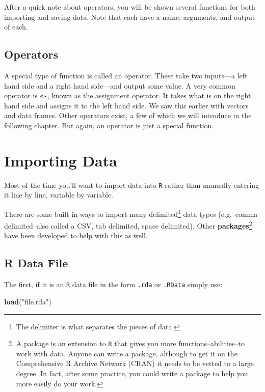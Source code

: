 \documentclass[]{tufte-book}
\newenvironment{Shaded}{}{}
\newcommand{\KeywordTok}[1]{\textcolor[rgb]{0.00,0.44,0.13}{\textbf{#1}}}
\newcommand{\StringTok}[1]{\textcolor[rgb]{0.25,0.44,0.63}{#1}}
\newcommand{\NormalTok}[1]{#1}
\theoremstyle{definition}
\theoremstyle{definition}
\theoremstyle{remark}
\begin{document}
After a quick note about operators, you will be shown several functions
for both importing and saving data. Note that each have a name,
arguments, and output of each.

\subsection*{Operators}\label{operators}

A special type of function is called an operator. These take two
inputs---a left hand side and a right hand side---and output some value.
A very common operator is \texttt{\textless{}-}, known as the assignment
operator. It takes what is on the right hand side and assigns it to the
left hand side. We saw this earlier with vectors and data frames. Other
operators exist, a few of which we will introduce in the following
chapter. But again, an operator is just a special function.

\section*{Importing Data}\label{importing-data}

Most of the time you'll want to import data into \texttt{R} rather than
manually entering it line by line, variable by variable.

There are some built in ways to import many delimited\footnote{The
  delimiter is what separates the pieces of data.} data types
(e.g.~comma delimited--also called a CSV, tab delimited, space
delimited). Other \textbf{packages}\footnote{A package is an extension
  to \texttt{R} that gives you more functions--abilities--to work with
  data. Anyone can write a package, although to get it on the
  Comprehensive R Archive Network (CRAN) it needs to be vetted to a
  large degree. In fact, after some practice, you could write a package
  to help you more easily do your work.} have been developed to help
with this as well.

\subsection*{R Data File}\label{r-data-file}

The first, if it is an \texttt{R} data file in the form \texttt{.rda} or
\texttt{.RData} simply use:

\begin{Shaded}
\begin{Highlighting}[]
\KeywordTok{load}\NormalTok{(}\StringTok{"file.rda"}\NormalTok{)}
\end{Highlighting}
\end{Shaded}
\end{document}
